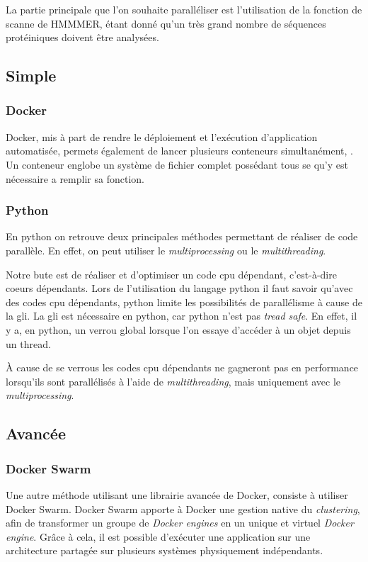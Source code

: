 La partie principale que l'on souhaite paralléliser est l'utilisation de la fonction de scanne de HMMMER, étant donné qu'un très grand nombre de séquences protéiniques doivent être analysées.

\subsection{Simple}
\subsubsection{Docker}
Docker, mis à part de rendre le déploiement et l'exécution d'application automatisée, permets également de lancer plusieurs conteneurs simultanément, . Un conteneur englobe un système de fichier complet possédant tous se qu'y est nécessaire a remplir sa fonction. 

\subsubsection{Python}
En python on retrouve deux principales méthodes permettant de réaliser de code parallèle. En effet, on peut utiliser le \emph{multiprocessing} ou le \emph{multithreading}.

Notre bute est de réaliser et d'optimiser un code \gls{cpu} dépendant, c'est-à-dire coeurs dépendants. Lors de l'utilisation du langage python il faut savoir qu'avec des codes \gls{cpu} dépendants, python limite les possibilités de parallélisme à cause de la \gls{gli}. La \gls{gli} est nécessaire en python, car python n'est pas \emph{tread safe}. En effet, il y a, en python, un verrou global lorsque l'on essaye d'accéder à un objet depuis un thread.

À cause de se verrous les codes \gls{cpu} dépendants ne gagneront pas en performance lorsqu'ils sont parallélisés à l'aide de \emph{multithreading}, mais uniquement avec le \emph{multiprocessing}.

\subsection{Avancée}
\subsubsection{Docker Swarm}
Une autre méthode utilisant une librairie avancée de Docker, consiste à utiliser Docker Swarm. Docker Swarm apporte à Docker une gestion native du \emph{clustering}, afin de transformer un groupe de \emph{Docker engines} en un unique et virtuel \emph{Docker engine}. Grâce à cela, il est possible d'exécuter une application sur une architecture partagée sur plusieurs systèmes physiquement indépendants. 

